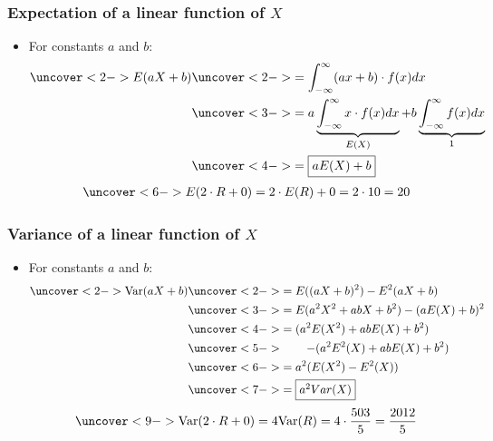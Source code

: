\documentclass[handout]{beamer}\usepackage[]{graphicx}\usepackage[]{color}
\numberwithin{equation}{section}
\begin{document}
\begin{frame}
\frametitle{Expectation of a linear function of $X$} \small
\begin{itemize}
\item For constants $a$ and $b$:
\pause \begin{align*}
\uncover<2->{E(aX + b)} & \uncover<2->{= \int_{-\infty}^\infty (ax + b) \cdot f(x) dx} \\
&\uncover<3->{= a \underbrace{\int_{-\infty}^\infty x \cdot f(x) dx}_{E(X)} + b \underbrace{\int_{-\infty}^\infty f(x) dx }_{1} }\\
&\uncover<4->{= \fbox{$a E(X) + b$}}
\end{align*}
\begin{align*}
\uncover<6->{E(2\cdot R + 0) = 2 \cdot E(R) + 0 = 2 \cdot 10 = 20 }
\end{align*}
\end{itemize}
\end{frame}

\begin{frame}
\frametitle{Variance of a linear function of $X$} \small
\begin{itemize}
\item For constants $a$ and $b$:
\begin{align*}
\uncover<2->{\text{Var}(aX + b)} & \uncover<2->{= E((aX + b)^2) - E^2(aX + b)} \\
&\uncover<3->{= E(a^2 X^2 + ab X + b^2) - (a E(X) + b)^2} \\
&\uncover<4->{= ( a^2 E(X^2) + ab E(X) + b^2)} \\
&\uncover<5->{ \qquad- (a^2 E^2(X) +  ab E(X) + b^2)} \\
&\uncover<6->{= a^2 (E(X^2) - E^2(X))} \\
&\uncover<7->{= \fbox{$a^2 Var(X)$}}
\end{align*}
\begin{align*}
\uncover<9->{\text{Var}(2 \cdot R + 0) = 4 \text{Var}(R) = 4 \cdot \frac{503}{5} = \frac{2012}{5}}
\end{align*}
\end{itemize}
\end{frame}
\end{document}

